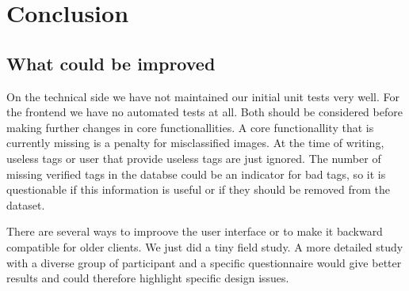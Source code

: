 \section{Conclusion}
\label{g1:sec:conclusion}

\subsection{What could be improved}
On the technical side we have not maintained our initial unit tests very well. For the frontend we have no automated tests at all. Both should be considered before making further changes in core functionallities.
A core functionallity that is currently missing is a penalty for misclassified images. At the time of writing, useless tags or user that provide useless tags are just ignored. The number of missing verified tags in the databse could be an indicator for bad tags, so it is questionable if this information is useful or if they should be removed from the dataset.

There are several ways to improove the user interface or to make it backward compatible for older clients. We just did a tiny field study. A more detailed study with a diverse group of participant and a specific questionnaire would give better results and could therefore highlight specific design issues.
